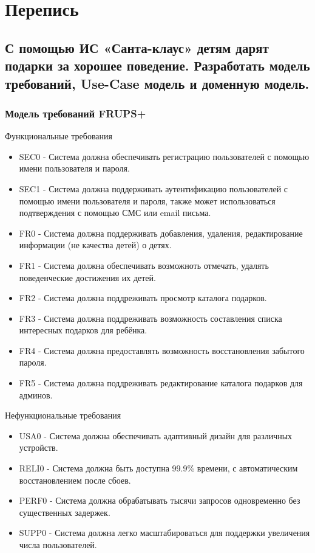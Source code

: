 \documentclass{article}
\begin{document}
\tableofcontents
\newpage

\section[Перепись]{Перепись}
\subsection[Санта-клаус]{С помощью ИС «Санта-клаус» детям дарят подарки за хорошее поведение. Разработать модель требований, Use-Case модель и доменную модель.}
\subsubsection{Модель требований FRUPS+}
Функциональные требования
\begin{itemize}
    \item SEC0 - Система должна обеспечивать регистрацию пользователей с помощью имени пользователя и пароля.
    \item SEC1 - Система должна поддерживать аутентификацию пользователей с помощью имени пользователя и пароля, также может использоваться подтверждения с помощью СМС или email письма.
    \item FR0 - Система должна поддерживать добавления, удаления, редактирование информации (не качества детей) о детях.
    \item FR1 - Система должна обеспечивать возможноть отмечать, удалять поведенческие достижения их детей.
    \item FR2 - Система должна поддреживать просмотр каталога подарков.
    \item FR3 - Система должна поддреживать возможность составления списка интересных подарков для ребёнка.
    \item FR4 - Система должна предоставлять возможность восстановления забытого пароля.
    \item FR5 - Система должна поддреживать редактирование каталога подарков для админов.
\end{itemize}
Нефункциональные требования
\begin{itemize}
    \item USA0 - Система должна обеспечивать адаптивный дизайн для различных устройств.
    \item RELI0 - Система должна быть доступна 99.9\% времени, с автоматическим восстановлением после сбоев.
    \item PERF0 - Система должна обрабатывать тысячи запросов одновременно без существенных задержек.
    \item SUPP0 - Система должна легко масштабироваться для поддержки увеличения числа пользователей.
\end{itemize}
\end{document}
